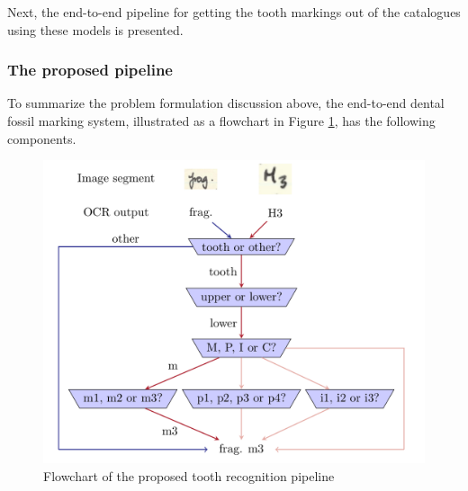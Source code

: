 \documentclass{article}
\begin{document}
Next, the end-to-end pipeline for getting the tooth markings out of the catalogues using these models is presented.

\subsubsection{The proposed pipeline}


To summarize the problem formulation discussion above, the end-to-end dental fossil marking system,
illustrated as a flowchart in Figure \ref{fig:pipeline}, has 
the following components. 

\begin{figure}[h]
    \centering
    \includegraphics*[scale=.3]{../images/flowchart.png}
    \caption{Flowchart of the proposed tooth recognition pipeline}
    \label{fig:pipeline}
\end{figure}
\end{document}

